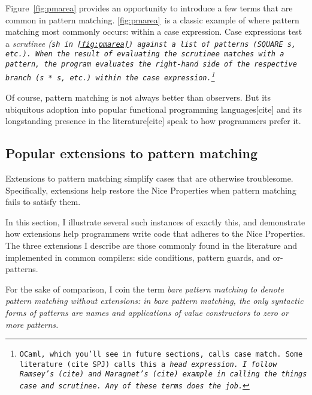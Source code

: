 \documentclass[manuscript,screen,review, 12pt, nonacm]{acmart}
\begin{document}
\begin{outline}[enumerate]
    Figure~\ref{fig:pmarea} provides an opportunity to introduce a few terms
    that are common in pattern matching. \ref{fig:pmarea}~is a classic example
    of where pattern matching most commonly occurs: within a case expression.
    Case expressions test a \it{scrutinee} (\tt{sh} in~\ref{fig:pmarea}) against
    a list of patterns (\tt{SQUARE s}, etc.). When the result of evaluating the
    scrutinee matches with a pattern, the program evaluates the right-hand side
    of the respective branch (\tt{s * s}, etc.) within the case
    expression.\footnote{OCaml, which you'll see in future sections, calls case
    \tt{match}. Some literature (cite SPJ) calls this a \it{head expression}. I
    follow Ramsey's (cite) and Maragnet's (cite) example in calling the things
    \it{case} and \it{scrutinee}. Any of these terms does the job.} 

Of course, pattern matching is not always better than observers. But its
ubiquitous adoption into popular functional programming languages[cite] and its
longstanding presence in the literature[cite] speak to how programmers prefer
it. 



\subsection{Popular extensions to pattern matching}
\label{extensions}

    Extensions to pattern matching simplify cases that are otherwise
    troublesome. Specifically, extensions help restore the Nice Properties when
    pattern matching fails to satisfy them. 
    
    In this section, I illustrate several such instances of exactly this, and
    demonstrate how extensions help programmers write code that adheres to the
    Nice Properties. The three extensions I describe are those commonly found in
    the literature and implemented in common compilers: side conditions, pattern
    guards, and or-patterns. 
    
    For the sake of comparison, I coin the term \it{bare pattern matching} to
    denote pattern matching \it{without} extensions: in bare pattern matching,
    the only syntactic forms of patterns are names and applications of value
    constructors to zero or more patterns. 



\end{outline}
\end{document}

